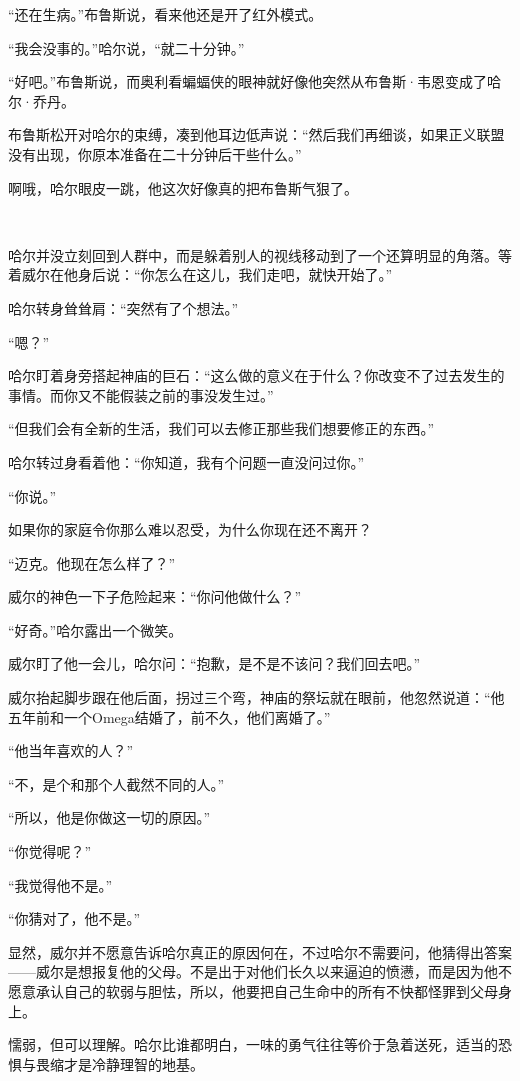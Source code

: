 \documentclass[../main]{subfiles}
\begin{document}
“还在生病。”布鲁斯说，看来他还是开了红外模式。

“我会没事的。”哈尔说，“就二十分钟。”

“好吧。”布鲁斯说，而奥利看蝙蝠侠的眼神就好像他突然从布鲁斯·韦恩变成了哈尔·乔丹。

布鲁斯松开对哈尔的束缚，凑到他耳边低声说：“然后我们再细谈，如果正义联盟没有出现，你原本准备在二十分钟后干些什么。”

啊哦，哈尔眼皮一跳，他这次好像真的把布鲁斯气狠了。

~\

哈尔并没立刻回到人群中，而是躲着别人的视线移动到了一个还算明显的角落。等着威尔在他身后说：“你怎么在这儿，我们走吧，就快开始了。”

哈尔转身耸耸肩：“突然有了个想法。”

“嗯？”

哈尔盯着身旁搭起神庙的巨石：“这么做的意义在于什么？你改变不了过去发生的事情。而你又不能假装之前的事没发生过。”

“但我们会有全新的生活，我们可以去修正那些我们想要修正的东西。”

哈尔转过身看着他：“你知道，我有个问题一直没问过你。”

“你说。”

如果你的家庭令你那么难以忍受，为什么你现在还不离开？

“迈克。他现在怎么样了？”

威尔的神色一下子危险起来：“你问他做什么？”

“好奇。”哈尔露出一个微笑。

威尔盯了他一会儿，哈尔问：“抱歉，是不是不该问？我们回去吧。”

威尔抬起脚步跟在他后面，拐过三个弯，神庙的祭坛就在眼前，他忽然说道：“他五年前和一个Omega结婚了，前不久，他们离婚了。”

“他当年喜欢的人？”

“不，是个和那个人截然不同的人。”

“所以，他是你做这一切的原因。”

“你觉得呢？”

“我觉得他不是。”

“你猜对了，他不是。”

显然，威尔并不愿意告诉哈尔真正的原因何在，不过哈尔不需要问，他猜得出答案——威尔是想报复他的父母。不是出于对他们长久以来逼迫的愤懑，而是因为他不愿意承认自己的软弱与胆怯，所以，他要把自己生命中的所有不快都怪罪到父母身上。

懦弱，但可以理解。哈尔比谁都明白，一味的勇气往往等价于急着送死，适当的恐惧与畏缩才是冷静理智的地基。
\end{document}
